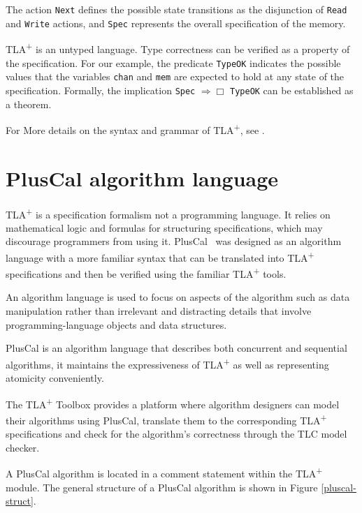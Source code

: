 \documentclass{thesul}
\newcommand{\tlaplus}{TLA\textsuperscript{+}\xspace}
\begin{document}
The action \verb|Next| defines the possible state transitions as the disjunction of \verb|Read| and \verb|Write| actions, and \verb|Spec| represents the overall specification of the memory.

\tlaplus is an untyped language. Type correctness can be verified as a property of the specification. For our example, the predicate \verb|TypeOK| indicates the possible values that the variables \verb|chan| and \verb|mem| are expected to hold at any state of the specification. Formally, the implication \verb|Spec| $\Rightarrow \Box$ \verb|TypeOK| can be established as a theorem.

\bigskip


For More details on the syntax and grammar of \tlaplus, see \cite{tlabook} \cite{tlaplus}.

\section{PlusCal algorithm language}

\tlaplus is a specification formalism not a programming language. It relies on mathematical logic and formulas for structuring specifications, which may discourage programmers from using it. PlusCal~\cite{pcalAlgo} was designed as an algorithm language with a more familiar syntax that can be translated into \tlaplus specifications and then be verified using the familiar \tlaplus tools.

An algorithm language is used to focus on aspects of the algorithm such as data manipulation rather than irrelevant and distracting details that involve programming-language objects and data structures.
	
PlusCal is an algorithm language that describes both concurrent and sequential algorithms, it maintains the expressiveness of \tlaplus as well as representing atomicity conveniently.

The \tlaplus Toolbox provides a platform where algorithm designers can model their algorithms using PlusCal, translate them to the corresponding \tlaplus specifications and check for the algorithm's correctness through the TLC model checker.

A PlusCal algorithm is located in a comment statement within the \tlaplus module. The general structure of a PlusCal algorithm is shown in Figure \ref{pluscal-struct}.
\end{document}

